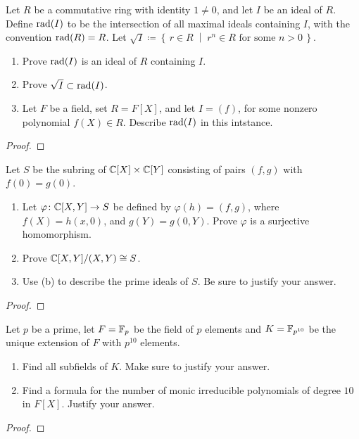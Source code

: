 \begin{problem}
Let $R$ be a commutative ring with identity $1\neq 0$, and let $I$ be an
ideal of $R$. Define $\operatorname{rad}(I)$ to be the intersection of all maximal ideals
containing $I$, with the convention $\operatorname{rad}(R)=R$. Let
$\sqrt{I}\coloneqq\left\{\,r\in R\;\middle|\;\text{$r^n\in R$ for some
    $n>0$}\,\right\}$.
\begin{enumerate}[label=(\alph*)]
\item Prove $\operatorname{rad}(I)$ is an ideal of $R$ containing $I$.
\item Prove $\sqrt{I}\subset\operatorname{rad}(I)$.
\item Let $F$ be a field, set $R=F[X]$, and let $I=(f)$, for some nonzero
  polynomial $f(X)\in R$. Describe $\operatorname{rad}(I)$ in this intstance.
\end{enumerate}
\end{problem}
\begin{proof}
\end{proof}

\begin{problem}
Let $S$ be the subring of $\mathbb{C}[X]\times\mathbb{C}[Y]$ consisting of pairs
$(f,g)$ with $f(0)=g(0)$.
\begin{enumerate}[label=(\alph*)]
\item Let $\varphi\colon\mathbb{C}[X,Y]\to S$ be defined by $\varphi(h)=(f,g)$,
  where $f(X)=h(x,0)$, and $g(Y)=g(0,Y)$. Prove $\varphi$ is a surjective
  homomorphism.
\item Prove $\mathbb{C}[X,Y]/(X,Y)\cong S$.
\item Use (b) to describe the prime ideals of $S$. Be sure to justify your
  answer.
\end{enumerate}
\end{problem}
\begin{proof}
\end{proof}

\begin{problem}
Let $p$ be a prime, let $F=\mathbb{F}_p$ be the field of $p$ elements and
$K=\mathbb{F}_{p^{10}}$ be the unique extension of $F$ with $p^{10}$ elements.
\begin{enumerate}[label=(\alph*)]
\item Find all subfields of $K$. Make sure to justify your answer.
\item Find a formula for the number of monic irreducible polynomials of
  degree $10$ in $F[X]$. Justify your answer.
\end{enumerate}
\end{problem}
\begin{proof}
\end{proof}


